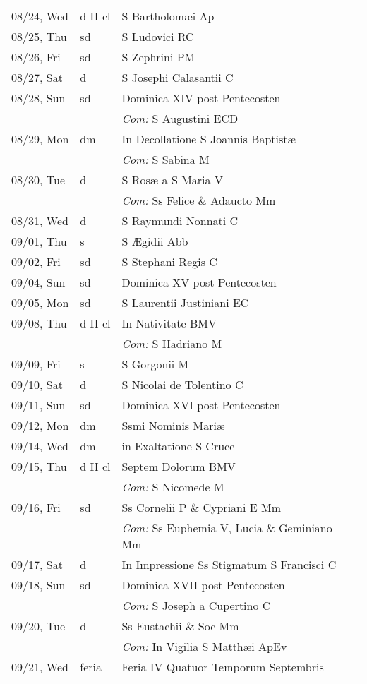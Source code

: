 \documentclass[10pt]{article}
\begin{document}
\begin{longtable}{ l l l }
08/24, Wed & d II cl & S Bartholomæi Ap\\
08/25, Thu & sd & S Ludovici RC\\
08/26, Fri & sd & S Zephrini PM\\
08/27, Sat & d & S Josephi Calasantii C\\
08/28, Sun & sd & Dominica XIV post Pentecosten\\
 & & \textit{Com:} S Augustini ECD\\
08/29, Mon & dm & In Decollatione S Joannis Baptistæ\\
 & & \textit{Com:} S Sabina M\\
08/30, Tue & d & S Rosæ a S Maria V\\
 & & \textit{Com:} Ss Felice \& Adaucto Mm\\
08/31, Wed & d & S Raymundi Nonnati C\\
09/01, Thu & s & S Ægidii Abb\\
09/02, Fri & sd & S Stephani Regis C\\
09/04, Sun & sd & Dominica XV post Pentecosten\\
09/05, Mon & sd & S Laurentii Justiniani EC\\
09/08, Thu & d II cl & In Nativitate BMV\\
 & & \textit{Com:} S Hadriano M\\
09/09, Fri & s & S Gorgonii M\\
09/10, Sat & d & S Nicolai de Tolentino C\\
09/11, Sun & sd & Dominica XVI post Pentecosten\\
09/12, Mon & dm & Ssmi Nominis Mariæ\\
09/14, Wed & dm & in Exaltatione S Cruce\\
09/15, Thu & d II cl & Septem Dolorum BMV\\
 & & \textit{Com:} S Nicomede M\\
09/16, Fri & sd & Ss Cornelii P \& Cypriani E Mm\\
 & & \textit{Com:} Ss Euphemia V, Lucia \& Geminiano Mm\\
09/17, Sat & d & In Impressione Ss Stigmatum S Francisci C\\
09/18, Sun & sd & Dominica XVII post Pentecosten\\
 & & \textit{Com:} S Joseph a Cupertino C\\
09/20, Tue & d & Ss Eustachii \& Soc Mm\\
 & & \textit{Com:} In Vigilia S Matthæi ApEv\\
09/21, Wed & feria & Feria IV Quatuor Temporum Septembris\\

\end{longtable}
\end{document}
